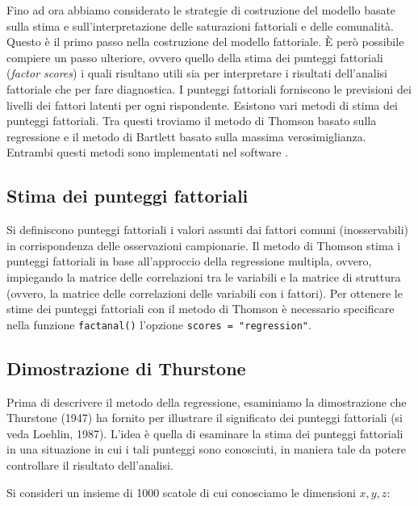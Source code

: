 \documentclass[
  11pt,
]{krantz}
\begin{document}
Fino ad ora abbiamo considerato le strategie di costruzione del modello basate sulla stima e sull'interpretazione delle saturazioni fattoriali e delle comunalità. Questo è il primo passo nella costruzione del modello fattoriale. È però possibile compiere un passo ulteriore, ovvero quello della stima dei punteggi fattoriali (\emph{factor scores}) i quali risultano utili sia per interpretare i risultati dell'analisi fattoriale che per fare diagnostica. I punteggi fattoriali forniscono le previsioni dei livelli dei fattori latenti per ogni rispondente. Esistono vari metodi di stima dei punteggi fattoriali. Tra questi troviamo il metodo di Thomson basato sulla regressione e il metodo di Bartlett basato sulla massima verosimiglianza. Entrambi questi metodi sono implementati nel software .

\hypertarget{stima-dei-punteggi-fattoriali}{%
\subsection{Stima dei punteggi fattoriali}\label{stima-dei-punteggi-fattoriali}}

Si definiscono punteggi fattoriali i valori assunti dai fattori comuni (inosservabili) in corrispondenza delle osservazioni campionarie. Il metodo di Thomson stima i punteggi fattoriali in base all'approccio della regressione multipla, ovvero, impiegando la matrice delle correlazioni tra le variabili e la matrice di struttura (ovvero, la matrice delle correlazioni delle variabili con i fattori). Per ottenere le stime dei punteggi fattoriali con il metodo di Thomson è necessario specificare nella funzione \texttt{factanal()} l'opzione \texttt{scores\ =\ "regression"}.

\hypertarget{dimostrazione-di-thurstone}{%
\subsection{Dimostrazione di Thurstone}\label{dimostrazione-di-thurstone}}

Prima di descrivere il metodo della regressione, esaminiamo la dimostrazione che Thurstone (1947) ha fornito per illustrare il significato dei punteggi fattoriali (si veda Loehlin, 1987). L'idea è quella di esaminare la stima dei punteggi fattoriali in una situazione in cui i tali punteggi sono conosciuti, in maniera tale da potere controllare il risultato dell'analisi.

Si consideri un insieme di 1000 scatole di cui conosciamo le dimensioni \(x, y, z\):
\end{document}
